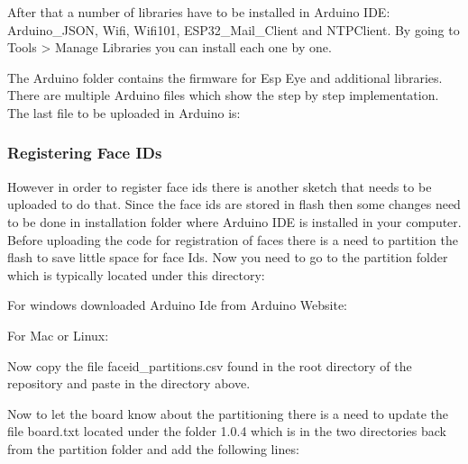 After that a number of libraries have to be installed in Arduino IDE: {\selectfont Arduino\_JSON}, {\selectfont Wifi}, {\selectfont Wifi101}, {\selectfont ESP32\_Mail\_Client} and {\selectfont NTPClient}. 
By going to Tools > Manage Libraries you can install each one by one. 

The {\selectfont Arduino} folder contains the firmware for Esp Eye and additional libraries. There are multiple Arduino files which show the step by step implementation. The last file to be uploaded in Arduino is: 

 \par

\subsubsection{Registering Face IDs}
However in order to register face ids there is another sketch that needs to be uploaded to do that. Since the face ids are stored in flash then some changes need to be done in installation folder where Arduino IDE is installed in your computer. Before uploading the code for registration of faces there is a need to partition the flash to save little space for face Ids. Now you need to go to the partition folder which is typically located under this directory:
 
For windows downloaded Arduino Ide from Arduino Website:

 

For Mac or Linux: 


Now copy the file {\selectfont faceid\_partitions.csv} found in the root directory of the repository and paste in the directory above. 

Now to let the board know about the partitioning there is a need to update the file {\selectfont board.txt } located under the folder 1.0.4 which is in the two directories back from the partition folder and add the following lines: 

